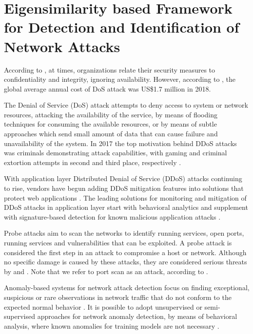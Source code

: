 \chapter{Eigensimilarity based Framework for Detection and Identification of Network Attacks}
\label{ch:2_mos_eig_sim}

According to \cite{Hevesi2019}, at times, organizations relate their security measures to confidentiality and integrity, ignoring availability. However, according to \cite{BISSELL2019}, the global average annual cost of DoS attack was US\$1.7 million in 2018.

The Denial of Service (DoS) attack attempts to deny access to system or network resources, attacking the availability of the service, by means of flooding techniques for consuming the available resources, or by means of subtle approaches which send small amount of data that can cause failure and unavailability of the system. In 2017 the top motivation behind DDoS attacks was criminals demonstrating attack capabilities, with gaming and criminal extortion attempts in second and third place, respectively \cite{cisco2019}.

With application layer Distributed Denial of Service (DDoS) attacks continuing to rise, vendors have begun adding DDoS mitigation features into solutions that protect web applications \cite{Hevesi2019}. The leading solutions for monitoring and mitigation of DDoS attacks in application layer start with behavioral analytics and supplement with signature-based detection for known malicious application attacks \cite{Hevesi2019}.

Probe attacks aim to scan the networks to identify running services, open ports, running services and vulnerabilities that can be exploited. A probe attack is considered the first step in an attack to compromise a host or network. Although no specific damage is caused by these attacks, they are considered serious threats by \cite{ahmed2016survey} and \cite{moustafa2019holistic}. Note that we refer to port scan as an attack, according to \cite{ahmed2016survey}.

Anomaly-based systems for network attack detection focus on finding exceptional, suspicious or rare observations in network traffic that do not conform to the expected normal behavior \cite{bhuyan2014network}. It is possible to adopt unsupervised or semi-supervised approaches for network anomaly detection, by means of behavioral analysis, where known anomalies for training models are not necessary \cite{moustafa2019holistic}. 

